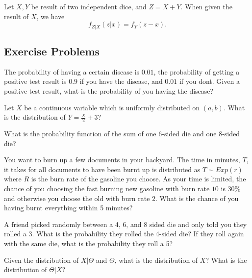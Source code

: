 \begin{example}
	Let \(X, Y\) be result of two independent dice, and \(Z = X+Y\). When given the result of \(X\), we have 
	\[
		f _{Z| X}(z| x) = f _{Y}(z-x).
	\]
\end{example}


\subsection{Exercise Problems}

\begin{problem}
	The probability of having a certain disease is \(0.01\), the probability of getting a positive test result is \(0.9\) if you have the disease, and \(0.01\) if you dont. Given a positive test result, what is the probability of you having the disease?
\end{problem}

\begin{problem}
	Let \(X\) be a continuous variable which is uniformly distributed on \((a, b)\). What is the distribution of \(Y = \frac{X}{2} + 3\)?
\end{problem}

\begin{problem}
	What is the probability function of the sum of one 6-sided die and one 8-sided die?
\end{problem}

\begin{problem} %
	You want to burn up a few documents in your backyard. The time in minutes, \(T\), it takes for all documents to have been burnt up is distributed as \(T \sim Exp(r)\) where \(R\) is the burn rate of the gasoline you choose. As your time is limited, the chance of you choosing the fast burning new gasoline with burn rate \(10\) is \(30\%\) and otherwise you choose the old with burn rate \(2\). What is the chance of you having burnt everything within 5 minutes?
\end{problem}

\begin{problem}
	A friend picked randomly between a 4, 6, and 8 sided die and only told you they rolled a 3. What is the probability they rolled the 4-sided die? If they roll again with the same die, what is the probability they roll a 5?
\end{problem}

\begin{problem}
	Given the distribution of \(X|\Theta\) and \(\Theta\), what is the distribution of \(X\)? What is the distribution of \(\Theta |X\)?
\end{problem}
